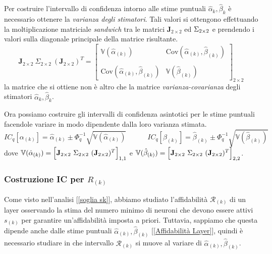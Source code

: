 \documentclass[10pt]{article} %
\begin{document}
Per costruire l'intervallo di confidenza intorno alle stime puntuali $\hat{\alpha}_{k}, \hat{\beta}_{k}$ è necessario ottenere la \textit{varianza degli stimatori}. Tali valori si ottengono effettuando la moltiplicazione matriciale \textit{sandwich} tra le matrici $\mathbf{J}_{2\times2}$ ed $\large\Sigma_{2\times2}$ e prendendo i valori sulla diagonale principale della matrice risultante.
\begin{equation}\label{matriceSandwich}
     \mathbf{J}_{2\times2}\ \Sigma_{2\times2}\ (\mathbf{J}_{2\times2})^{T} =
     \begin{bmatrix}
         \mathbb{V}(\hat{\alpha}_{(k)}) & \text{Cov}(\hat{\alpha}_{(k)}, \hat{\beta}_{(k)}) \\ \\
         \text{Cov}(\hat{\alpha}_{(k)}, \hat{\beta}_{(k)}) & \mathbb{V}(\hat{\beta}_{(k)})
     \end{bmatrix}_{2\times2}
\end{equation}
la matrice che si ottiene non è altro che la matrice \textit{varianza-covarianza} degli stimatori $\hat{\alpha}_{k}, \hat{\beta}_{k}$. 

Ora possiamo costruire gli intervalli di confidenza asintotici per le stime puntuali facendole variare in modo dipendente dalla loro varianza stimata.
\begin{equation}
    IC_{q}[\alpha_{(k)}]
    = \hat{\alpha}_{(k)}\pm \Phi^{-1}_q\sqrt{\mathbb{V}(\hat{\alpha}_{(k)})} \qquad \quad
    IC_{q}[\beta_{(k)}]
    = \hat{\beta}_{(k)}\pm \Phi^{-1}_q\sqrt{\mathbb{V}(\hat{\beta}_{(k)})}
\end{equation}
dove $\mathbb{V}(\hat{\alpha}_{(k)}) = \Bigl[\mathbf{J}_{2\times2}\ \Sigma_{2\times2}\ (\mathbf{J}_{2\times2})^{T}\Bigr]_{1,1}$ e $\mathbb{V}(\hat{\beta}_{(k)}) = \Bigl[\mathbf{J}_{2\times2}\ \Sigma_{2\times2}\ (\mathbf{J}_{2\times2})^{T}\Bigr]_{2,2}$.

\subsubsection{Costruzione IC per $R_{(k)}$}
Come visto nell'analisi [\ref{soglia sk}], abbiamo studiato l'affidabilità $\mathcal{R}_{(k)}$ di un layer osservando la stima del numero minimo di neuroni che devono essere attivi $s_{(k)}$ per garantire un'affidabilità imposta a priori. Tuttavia, sappiamo che questa dipende anche dalle stime puntuali $\hat{\alpha}_{(k)}, \hat{\beta}_{(k)}$ [\ref{Affidabilità Layer}], quindi è necessario studiare in che intervallo $\mathcal{R}_{(k)}$ si muove al variare di $\hat{\alpha}_{(k)}, \hat{\beta}_{(k)}$.
\end{document}
